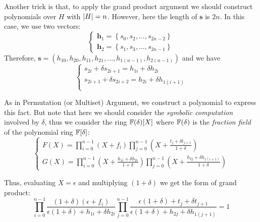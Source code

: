 \documentclass{article}
\begin{document}
Another trick is that, to apply the grand product argument we should construct polynomials over $H$ with $\abs{H} = n$. However, here the length of $\mathbf{s}$ is $2n$. In this case, we use two vectors:
\begin{equation*}
\begin{cases}
\mathbf{h}_1 = \left\{ s_0, s_2, \dots, s_{2n-2} \right\} \\
\mathbf{h}_2 = \left\{ s_1, s_3, \dots, s_{2n-1} \right\} 
\end{cases}
\end{equation*}
Therefore, $\mathbf{s} = \left( h_{10}, h_{20}, h_{11}, h_{21}, \dots, h_{1(n-1)}, h_{2(n-1)} \right)$ and we have
\begin{equation*}
\begin{cases}
s_{2i} + \delta s_{2i+1} = h_{1i} + \delta h_{2i} \\
s_{2i+1} + \delta s_{2i+2} = h_{2i} + \delta h_{1(i+1)} \\
\end{cases}
\end{equation*}

As in Permutation (or Multiset) Argument, we construct a polynomial to express this fact. But note that here we should consider the \textit{symbolic computation} involved by $\delta$, thus we consider the ring $\mathbb{F}(\delta) [X]$ where $\mathbb{F}(\delta)$ is the \textit{fraction field} of the polynomial ring $\mathbb{F}[\delta]$:
\begin{equation*}
\begin{cases}
F(X) = \prod_{i = 0}^{n-1} (X + f_i) \prod_{j = 0}^{n-1} (X + \frac{t_j + \delta t_{j +1}}{1 + \delta}) \\
G(X) = \prod_{i = 0}^{n-1} (X + \frac{h_{1i} + \delta h_{2i}}{1 + \delta}) \prod_{j = 0}^{n-1} (X + \frac{h_{2j} + \delta h_{1(i+1)}}{1 + \delta})
\end{cases}
\end{equation*}

Thus, evaluating $X = \epsilon$ and multiplying $(1 + \delta)$ we get the form of grand product:
\begin{equation*}
\prod_{i = 0}^{n-1} \frac{(1 + \delta) (\epsilon + f_i)}{\epsilon(1 + \delta) + h_{1i} + \delta h_{2i}} \prod_{j = 0}^{n-1} \frac{\epsilon(1 + \delta) + t_j + \delta t_{j + 1}}{\epsilon(1 + \delta) + h_{2j} + \delta h_{1(j+1)}}  = 1
\end{equation*}
\end{document}
